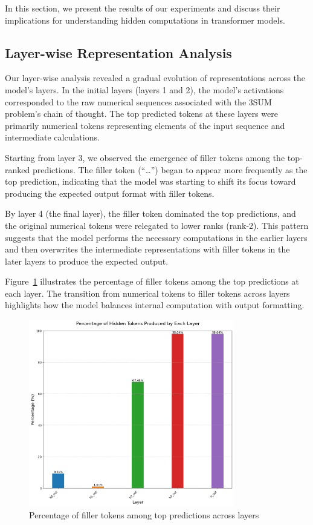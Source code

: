 \documentclass{article}
\begin{document}
In this section, we present the results of our experiments and discuss their implications for understanding hidden computations in transformer models.

\subsection{Layer-wise Representation Analysis}

Our layer-wise analysis revealed a gradual evolution of representations across the model's layers. In the initial layers (layers 1 and 2), the model's activations corresponded to the raw numerical sequences associated with the 3SUM problem's chain of thought. The top predicted tokens at these layers were primarily numerical tokens representing elements of the input sequence and intermediate calculations.

Starting from layer 3, we observed the emergence of filler tokens among the top-ranked predictions. The filler token (``\ldots'') began to appear more frequently as the top prediction, indicating that the model was starting to shift its focus toward producing the expected output format with filler tokens.

By layer 4 (the final layer), the filler token dominated the top predictions, and the original numerical tokens were relegated to lower ranks (rank-2). This pattern suggests that the model performs the necessary computations in the earlier layers and then overwrites the intermediate representations with filler tokens in the later layers to produce the expected output.

Figure~\ref{fig:hidden_token_percentages} illustrates the percentage of filler tokens among the top predictions at each layer. The transition from numerical tokens to filler tokens across layers highlights how the model balances internal computation with output formatting.

\begin{figure}[H]
\centering
\includegraphics[width=0.8\textwidth]{hidden_tokens_percentage_by_layer.png}
\caption{Percentage of filler tokens among top predictions across layers}
\label{fig:hidden_token_percentages}
\end{figure}
\end{document}
